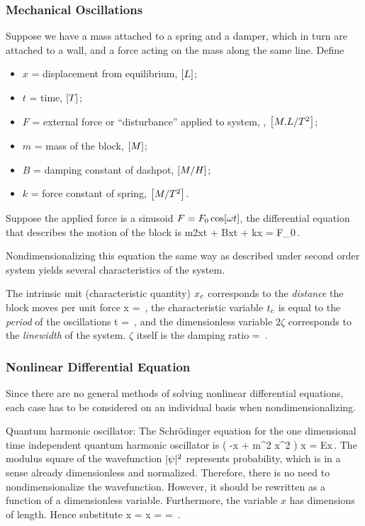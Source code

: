 \subsubsection{Mechanical Oscillations}
Suppose we have a mass attached to a spring and a damper, which in turn are attached to a wall, and a force acting on the mass along the same line. Define
\begin{itemize}
\item $x$ = displacement from equilibrium, $\left[{L}\right]$;
\item $t$ = time, $\left[{T}\right]$;
\item $F$ = external force or ``disturbance'' applied to system, , $\left[{M.L/T^2}\right]$;
\item $m$ = mass of the block, $\left[{M}\right]$;
\item $B$ = damping constant of dashpot, $\left[{M/H}\right]$;
\item $k$ = force constant of spring, $\left[{M/T^2}\right]$.
\end{itemize}
Suppose the applied force is a sinusoid $F = F_0\cos\!\left[{\omega t}\right]$, the differential equation that describes the motion of the block is
\beq
m\nxod 2xt + B\xod xt + kx = F_0\cos{}\,.
\eeq

Nondimensionalizing this equation the same way as described under second order system yields several characteristics of the system.

The intrinsic unit (characteristic quantity) ${x}_{c}$ corresponds to the \emph{distance} the block moves per unit force
\beq
\chpq x = \,,
\eeq
the characteristic variable ${t}_{c}$ is equal to the \emph{period} of the oscillations
\beq
\chpq t = \,,
\eeq
and the dimensionless variable $2\zeta$ corresponds to the \emph{linewidth} of the system. $\zeta$ itself is the damping ratio
\zeta = \,.
\eeq


\subsubsection{Nonlinear Differential Equation}
Since there are no general methods of solving nonlinear differential equations, each case has to be considered on an individual basis when nondimensionalizing.

Quantum harmonic oscillator: The Schrödinger equation for the one dimensional time independent quantum harmonic oscillator is
\beq
\left( -x + m\omega^2 x^2 \right) \psi\vat x = E\psi\vat x\,.
\eeq
The modulus square of the wavefunction $\lvert{\psi}\rvert^2$ represents probability, which is in a sense already dimensionless and normalized. Therefore, there is no need to nondimensionalize the wavefunction. However, it should be rewritten as a function of a dimensionless variable. Furthermore, the variable $x$ has dimensions of length. Hence substitute
\beq
\scpq x = \qquad{}\qquad \psi\vat x = \psi{} = \psi{}\,.
\eeq

